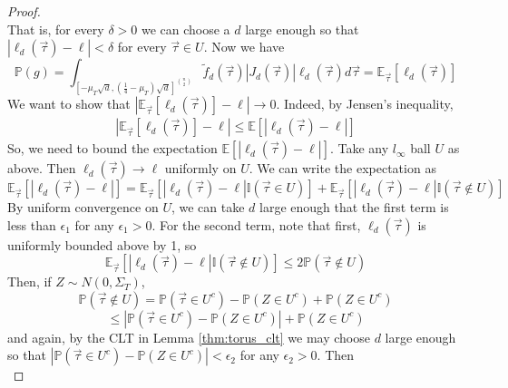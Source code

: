 \documentclass{article}
\newcommand{\prob}[1]{\mathbb{P}\left(#1\right)}
\newcommand{\ttz}[0]{\rightarrow 0}
\begin{document}
\begin{proof}
\begin{equation}
    \end{equation}
    That is, for every $\delta >0$ we can choose a $d$ large enough so that $|\ell_d(\vec{\tau}) - \ell| < \delta$ for every $\vec{\tau}\in U$. Now we have
    \begin{equation}
        \mathbb{P}(g) = \int_{[-\mu_T\sqrt{d}, \left(\frac{1}{4}-\mu_T\right)\sqrt{d}]^{\binom{n}{2}}} \tilde{f}_{d}(\vec{\tau})|J_d(\vec{\tau})| \ell_d(\vec{\tau})d\vec{\tau} = \mathbb{E}_{\vec{\tau}}[\ell_d(\vec{\tau})]
    \end{equation}
    We want to show that $|\mathbb{E}_{\vec{\tau}}[\ell_d(\vec{\tau})] - \ell| \ttz$. Indeed, by Jensen's inequality,
    \begin{align}
        |\mathbb{E}_{\vec{\tau}}[\ell_d(\vec{\tau})] - \ell| \leq \mathbb{E}[|\ell_d(\vec{\tau}) - \ell|]
    \end{align}
    So, we need to bound the expectation $\mathbb{E}[|\ell_d(\vec{\tau}) - \ell|]$. Take any $l_{\infty}$ ball $U$ as above. Then $\ell_d(\vec{\tau}) \rightarrow \ell$ uniformly on $U$. We can write the expectation as
    \begin{equation}
        \mathbb{E}_{\vec{\tau}}[|\ell_d(\vec{\tau})-\ell|]  = \mathbb{E}_{\vec{\tau}}[|\ell_d(\vec{\tau})-\ell| \mathbb{I}(\vec{\tau} \in U)] + \mathbb{E}_{\vec{\tau}}[|\ell_d(\vec{\tau})-\ell|\mathbb{I}(\vec{\tau} \notin U)]  
    \end{equation}
    By uniform convergence on $U$, we can take $d$ large enough that the first term is less than $\epsilon_1$ for any $\epsilon_1 > 0$. For the second term, note that first, $\ell_d(\vec{\tau})$ is uniformly bounded above by 1, so
    \begin{equation}
        \mathbb{E}_{\vec{\tau}}[|\ell_d(\vec{\tau})-\ell|\mathbb{I}(\vec{\tau} \notin U)]  \leq  2\prob{\vec{\tau} \notin U}
    \end{equation}
    Then, if $Z \sim N(0,\Sigma_T)$,
    \begin{equation}
        \prob{\vec{\tau} \notin U} = \prob{\vec{\tau} \in U^c} - \prob{Z \in U^c} + \prob{Z \in U^c} 
    \end{equation}
    \begin{equation}
        \leq |\prob{\vec{\tau} \in U^c} - \prob{Z \in U^c}| + \prob{Z \in U^c} 
    \end{equation}
    and again, by the CLT in Lemma \ref{thm:torus_clt} we may choose $d$ large enough so that $|\prob{\vec{\tau} \in U^c} - \prob{Z \in U^c}|< \epsilon_2$ for any $\epsilon_2 > 0$. Then
    \begin{equation}

\end{equation}
\end{proof}
\end{document}
